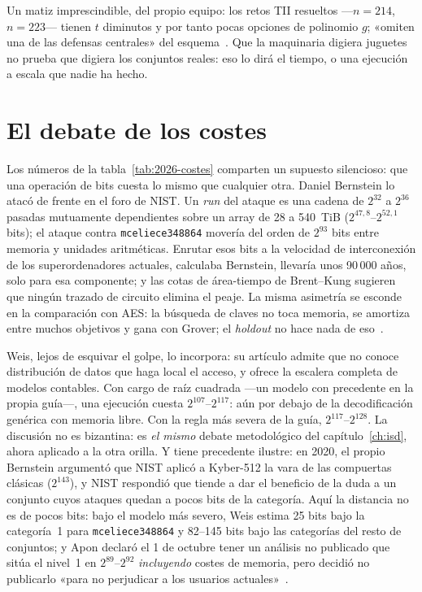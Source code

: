 Un matiz imprescindible, del propio equipo: los retos TII resueltos
---$n=214$, $n=223$--- tienen $t$ diminutos y por tanto pocas
opciones de polinomio $g$; «omiten una de las defensas centrales»
del esquema~\cite{cm610}. Que la maquinaria digiera juguetes no
prueba que digiera los conjuntos reales: eso lo dirá el tiempo, o
una ejecución a escala que nadie ha hecho.

\section{El debate de los costes}\label{sec:2026-costes}

Los números de la tabla~\ref{tab:2026-costes} comparten un supuesto
silencioso: que una operación de bits cuesta lo mismo que cualquier
otra. Daniel Bernstein lo atacó de frente en el foro de NIST. Un
\emph{run} del ataque es una cadena de $2^{32}$ a $2^{36}$ pasadas
mutuamente dependientes sobre un array de 28 a 540~TiB
($2^{47{,}8}$--$2^{52{,}1}$ bits); el ataque contra
\texttt{mceliece348864} movería del orden de $2^{93}$ bits entre
memoria y unidades aritméticas. Enrutar esos bits a la velocidad de
interconexión de los superordenadores actuales, calculaba Bernstein,
llevaría unos 90\,000 años, solo para esa componente; y las cotas
de área-tiempo de Brent--Kung sugieren que ningún trazado de
circuito elimina el peaje. La misma asimetría se esconde en la
comparación con AES: la búsqueda de claves no toca memoria, se
amortiza entre muchos objetivos y gana con Grover; el
\emph{holdout} no hace nada de eso~\cite{bernstein2026}.

Weis, lejos de esquivar el golpe, lo incorpora: su artículo admite
que no conoce distribución de datos que haga local el acceso, y
ofrece la escalera completa de modelos contables. Con cargo de
raíz cuadrada ---un modelo con precedente en la propia guía---, una
ejecución cuesta $2^{107}$--$2^{117}$: aún por debajo de la
decodificación genérica con memoria libre. Con la regla más severa
de la guía, $2^{117}$--$2^{128}$. La discusión no es bizantina: es
\emph{el mismo} debate metodológico del capítulo~\ref{ch:isd},
ahora aplicado a la otra orilla. Y tiene precedente ilustre: en
2020, el propio Bernstein argumentó que NIST aplicó a Kyber-512 la
vara de las compuertas clásicas ($2^{143}$), y NIST respondió que
tiende a dar el beneficio de la duda a un conjunto cuyos ataques
quedan a pocos bits de la categoría. Aquí la distancia no es de
pocos bits: bajo el modelo más severo, Weis estima 25 bits bajo la
categoría~1 para \texttt{mceliece348864} y 82--145 bits bajo las
categorías del resto de conjuntos; y Apon declaró el 1 de octubre
tener un análisis no publicado que sitúa el nivel~1 en
$2^{89}$--$2^{92}$ \emph{incluyendo} costes de memoria, pero
decidió no publicarlo «para no perjudicar a los usuarios
actuales»~\cite{weis2026,bernstein2026}.

